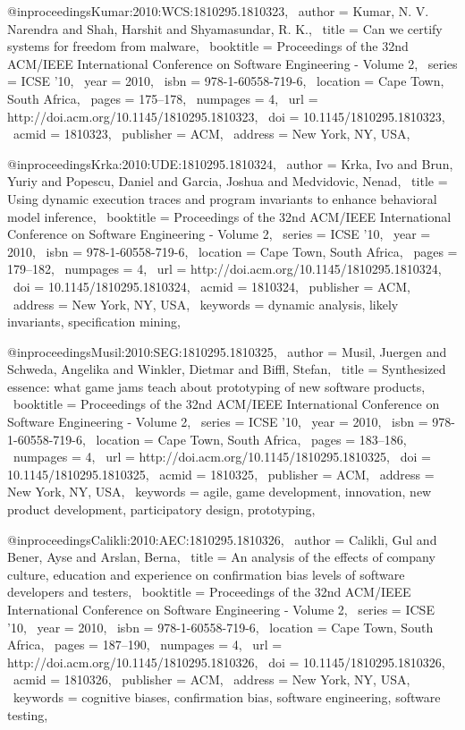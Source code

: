 @inproceedings{Kumar:2010:WCS:1810295.1810323,
 author = {Kumar, N. V. Narendra and Shah, Harshit and Shyamasundar, R. K.},
 title = {Can we certify systems for freedom from malware},
 booktitle = {Proceedings of the 32nd ACM/IEEE International Conference on Software Engineering - Volume 2},
 series = {ICSE '10},
 year = {2010},
 isbn = {978-1-60558-719-6},
 location = {Cape Town, South Africa},
 pages = {175--178},
 numpages = {4},
 url = {http://doi.acm.org/10.1145/1810295.1810323},
 doi = {10.1145/1810295.1810323},
 acmid = {1810323},
 publisher = {ACM},
 address = {New York, NY, USA},
} 

@inproceedings{Krka:2010:UDE:1810295.1810324,
 author = {Krka, Ivo and Brun, Yuriy and Popescu, Daniel and Garcia, Joshua and Medvidovic, Nenad},
 title = {Using dynamic execution traces and program invariants to enhance behavioral model inference},
 booktitle = {Proceedings of the 32nd ACM/IEEE International Conference on Software Engineering - Volume 2},
 series = {ICSE '10},
 year = {2010},
 isbn = {978-1-60558-719-6},
 location = {Cape Town, South Africa},
 pages = {179--182},
 numpages = {4},
 url = {http://doi.acm.org/10.1145/1810295.1810324},
 doi = {10.1145/1810295.1810324},
 acmid = {1810324},
 publisher = {ACM},
 address = {New York, NY, USA},
 keywords = {dynamic analysis, likely invariants, specification mining},
} 

@inproceedings{Musil:2010:SEG:1810295.1810325,
 author = {Musil, Juergen and Schweda, Angelika and Winkler, Dietmar and Biffl, Stefan},
 title = {Synthesized essence: what game jams teach about prototyping of new software products},
 booktitle = {Proceedings of the 32nd ACM/IEEE International Conference on Software Engineering - Volume 2},
 series = {ICSE '10},
 year = {2010},
 isbn = {978-1-60558-719-6},
 location = {Cape Town, South Africa},
 pages = {183--186},
 numpages = {4},
 url = {http://doi.acm.org/10.1145/1810295.1810325},
 doi = {10.1145/1810295.1810325},
 acmid = {1810325},
 publisher = {ACM},
 address = {New York, NY, USA},
 keywords = {agile, game development, innovation, new product development, participatory design, prototyping},
} 

@inproceedings{Calikli:2010:AEC:1810295.1810326,
 author = {Calikli, Gul and Bener, Ayse and Arslan, Berna},
 title = {An analysis of the effects of company culture, education and experience on confirmation bias levels of software developers and testers},
 booktitle = {Proceedings of the 32nd ACM/IEEE International Conference on Software Engineering - Volume 2},
 series = {ICSE '10},
 year = {2010},
 isbn = {978-1-60558-719-6},
 location = {Cape Town, South Africa},
 pages = {187--190},
 numpages = {4},
 url = {http://doi.acm.org/10.1145/1810295.1810326},
 doi = {10.1145/1810295.1810326},
 acmid = {1810326},
 publisher = {ACM},
 address = {New York, NY, USA},
 keywords = {cognitive biases, confirmation bias, software engineering, software testing},
} 

